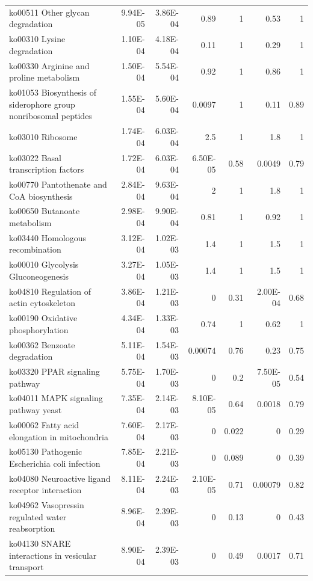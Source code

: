 {\begin{longtable}{ | l | r | r | r | r | r | r  | }
		ko00511 Other glycan degradation & 9.94E-05 & 3.86E-04 & 0.89 & 1 & 0.53 & 1 \\ 
		ko00310 Lysine degradation & 1.10E-04 & 4.18E-04 & 0.11 & 1 & 0.29 & 1 \\ 
		ko00330 Arginine and proline metabolism & 1.50E-04 & 5.54E-04 & 0.92 & 1 & 0.86 & 1 \\ 
		ko01053 Biosynthesis of siderophore group nonribosomal peptides & 1.55E-04 & 5.60E-04 & 0.0097 & 1 & 0.11 & 0.89 \\ 
		ko03010 Ribosome & 1.74E-04 & 6.03E-04 & 2.5 & 1 & 1.8 & 1 \\ 
		ko03022 Basal transcription factors & 1.72E-04 & 6.03E-04 & 6.50E-05 & 0.58 & 0.0049 & 0.79 \\ 
		ko00770 Pantothenate and CoA biosynthesis & 2.84E-04 & 9.63E-04 & 2 & 1 & 1.8 & 1 \\ 
		ko00650 Butanoate metabolism & 2.98E-04 & 9.90E-04 & 0.81 & 1 & 0.92 & 1 \\ 
		ko03440 Homologous recombination & 3.12E-04 & 1.02E-03 & 1.4 & 1 & 1.5 & 1 \\ 
		ko00010 Glycolysis Gluconeogenesis & 3.27E-04 & 1.05E-03 & 1.4 & 1 & 1.5 & 1 \\ 
		ko04810 Regulation of actin cytoskeleton & 3.86E-04 & 1.21E-03 & 0 & 0.31 & 2.00E-04 & 0.68 \\ 
		ko00190 Oxidative phosphorylation & 4.34E-04 & 1.33E-03 & 0.74 & 1 & 0.62 & 1 \\ 
		ko00362 Benzoate degradation & 5.11E-04 & 1.54E-03 & 0.00074 & 0.76 & 0.23 & 0.75 \\ 
		ko03320 PPAR signaling pathway & 5.75E-04 & 1.70E-03 & 0 & 0.2 & 7.50E-05 & 0.54 \\ 
		ko04011 MAPK signaling pathway yeast & 7.35E-04 & 2.14E-03 & 8.10E-05 & 0.64 & 0.0018 & 0.79 \\ 
		ko00062 Fatty acid elongation in mitochondria & 7.60E-04 & 2.17E-03 & 0 & 0.022 & 0 & 0.29 \\ 
		ko05130 Pathogenic Escherichia coli infection & 7.85E-04 & 2.21E-03 & 0 & 0.089 & 0 & 0.39 \\ 
		ko04080 Neuroactive ligand receptor interaction & 8.11E-04 & 2.24E-03 & 2.10E-05 & 0.71 & 0.00079 & 0.82 \\ 
		ko04962 Vasopressin regulated water reabsorption & 8.96E-04 & 2.39E-03 & 0 & 0.13 & 0 & 0.43 \\ 
		ko04130 SNARE interactions in vesicular transport & 8.90E-04 & 2.39E-03 & 0 & 0.49 & 0.0017 & 0.71 \\ 

\end{longtable}}
